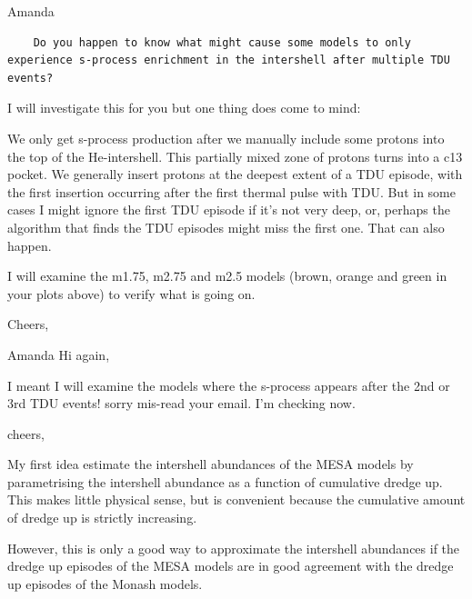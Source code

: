 \documentclass[a4paper,10pt]{article}
\begin{document}
\begin{minipage}{1.45\textwidth}
\begin{shadequote}{Amanda}
\begin{verbatim}
    Do you happen to know what might cause some models to only experience s-process enrichment in the intershell after multiple TDU events?
\end{verbatim}
I will investigate this for you but one thing does come to mind:

We only get s-process production after we manually include some protons into the top of the He-intershell. This partially mixed zone of protons turns into a c13 pocket. We generally insert protons at the deepest extent of a TDU episode, with the first insertion occurring after the first thermal pulse with TDU. But in some cases I might ignore the first TDU episode if it's not very deep, or, perhaps the algorithm that finds the TDU episodes might miss the first one. That can also happen. 

I will examine the m1.75, m2.75 and m2.5 models (brown, orange and green in your plots above) to verify what is going on.
 
Cheers,
\end{shadequote}
\end{minipage}

\hspace{0.2\textwidth}\begin{minipage}{1.35\textwidth}
\begin{shadequote}{Amanda}
Hi again,

I meant I will examine the models where the s-process appears after the 2nd or 3rd TDU events! sorry mis-read your email.
I'm checking now.

cheers,
\end{shadequote}
\end{minipage}


My first idea estimate the intershell abundances of the MESA models by parametrising the intershell abundance as a function of cumulative dredge up. This makes little physical sense, but is convenient because the cumulative amount of dredge up is strictly increasing.

However, this is only a good way to approximate the intershell abundances if the dredge up episodes of the MESA models are in good agreement with the dredge up episodes of the Monash models.

\begin{figure}[ht]
    \centering
\end{figure}
\end{document}
